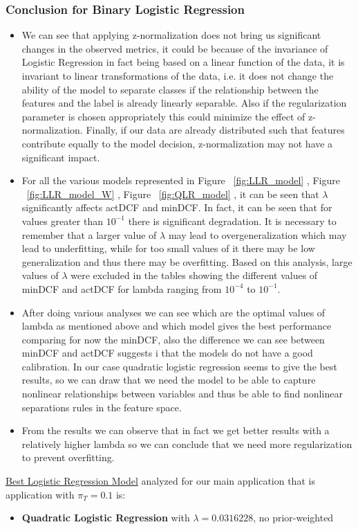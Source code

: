 \documentclass{article}
\begin{document}
\subsubsection*{Conclusion for Binary Logistic Regression}
\begin{itemize}
    \item We can see that applying z-normalization does not bring us significant changes in the observed metrics, it could be because of the invariance of Logistic Regression in fact being based on a linear function of the data, it is invariant to linear transformations of the data, i.e. it does not change the ability of the model to separate classes if the relationship between the features and the label is already linearly separable.  Also if the regularization parameter is chosen appropriately this could minimize the effect of z-normalization. Finally, if our data are already distributed such that features contribute equally to the model decision, z-normalization may not have a significant impact.  
    \item For all the various models represented in
    Figure ~\ref{fig:LLR_model} ,
    Figure ~\ref{fig:LLR_model_W} ,
    Figure ~\ref{fig:QLR_model} ,
    it can be seen that \(\lambda\) significantly affects actDCF and minDCF. In fact, it can be seen that for values greater than \(10^{-1}\) there is significant degradation. It is necessary to remember that a larger value of \(\lambda\) may lead to overgeneralization which may lead to underfitting, while for too small values of it there may be low generalization and thus there may be overfitting. Based on this analysis, large values of \(\lambda\) were excluded in the tables showing the different values of minDCF and actDCF for lambda ranging from \(10^{-4}\) to \(10^{-1}\).
\item After doing various analyses we can see which are the optimal values of lambda as mentioned above 
and which model gives the best performance comparing for now the minDCF, also the difference we can see between minDCF and actDCF suggests i that the models do not have a good calibration.
In our case quadratic logistic regression seems to give the best results, so we can draw that we need the model to be able to capture nonlinear relationships between variables and thus be able to find nonlinear separations rules in the feature space.
\item From the results we can observe that in fact we get better results with a relatively higher lambda so we can conclude that we need more regularization to prevent overfitting.
\end{itemize}
\underline{Best Logistic Regression Model} analyzed for our main application that is application with \(\pi_T=0.1\) is:
\begin{itemize}
    \item \textbf{Quadratic Logistic Regression} with \(\lambda=0.0316228\), no prior-weighted
\end{itemize}
\end{document}
